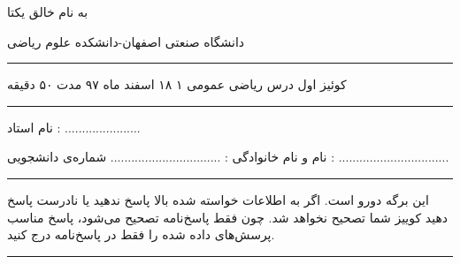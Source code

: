 \documentclass{article}
\begin{document}
{\bf 
\begin{center}          %
{ \huge به نام خالق یکتا}

{ \Large دانشگاه صنعتی اصفهان-دانشکده علوم ریاضی}

\vspace{0.5cm}
\hrule height .5mm
\vspace{0.5cm}

{\large       
کوئیز اول درس ریاضی عمومی ۱     
    \hspace{0.7cm} 
    ۱۸ اسفند ماه ۹۷
    \hspace{0.7cm}
  مدت ۵۰ دقیقه
  }
  
\vspace{0.5cm}
\hrule height .5mm
\vspace{0.5cm}

{\large نام استاد :
 ......................}
\vspace{0.5cm}

{\large نام و نام خانوادگی : 
................................}
{\large شماره‌ی  دانشجویی 
  : ................................}
\end{center}

\vspace{5mm}

\hrule height .5mm
\vskip 2mm

 این برگه دورو است. اگر به اطلاعات خواسته شده بالا پاسخ ندهید یا نادرست پاسخ دهید کوییز شما تصحیح
 نخواهد شد. چون فقط پاسخ‌نامه تصحیح می‌شود، پاسخ مناسب پرسش‌های داده شده را فقط در پاسخ‌نامه درج کنید.

\vskip 2mm
\hrule height .5mm
\vspace{0.3cm}

}
\end{document}
